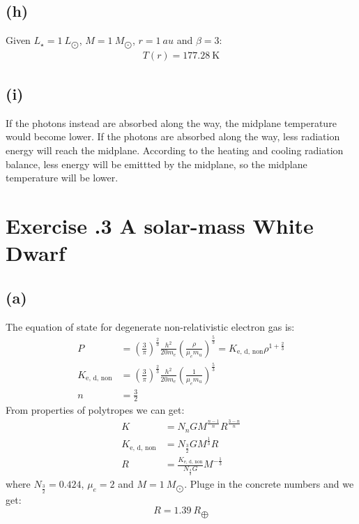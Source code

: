 \documentclass[a4paper,12pt]{article}
\begin{document}
\subsection*{(h)}
Given $L_\star = 1 \ L_{\bigodot}$, $M = 1 \ M_{\bigodot}$, $r = 1\ au$ and $\beta =3$:
\begin{align*}
    T(r) = 177.28 \ \text{K}
\end{align*}

\subsection*{(i)}
If the photons instead are absorbed along the way, 
the midplane temperature would become lower.
If the photons are absorbed along the way,
less radiation energy will reach the midplane. 
According to the heating and cooling radiation balance, 
less energy will be emittted by the midplane, so the 
midplane temperature will be lower.

\section*{\textbf{Exercise \uppercase\expandafter{}.3 A solar-mass White Dwarf}}
\subsection*{(a)}
The equation of state for degenerate non-relativistic electron gas is:
\begin{align*}
    P &= (\frac{3}{\pi})^{\frac{2}{3}} \frac{h^2}{20 m_e} (\frac{\rho}{\mu_e m_u})^{\frac{5}{3}} 
    = K_{\text{e, d, non}} \rho^{1 + \frac{2}{3}}\\
    K_{\text{e, d, non}} &= (\frac{3}{\pi})^{\frac{2}{3}} \frac{h^2}{20 m_e} (\frac{1}{\mu_e m_u})^{\frac{5}{3}} \\
    n &= \frac{3}{2} 
\end{align*}
From properties of polytropes we can get:
\begin{align*}
    K &= N_n G M^{\frac{n-1}{n}} R^{\frac{3-n}{n}} \\
    K_{\text{e, d, non}} &= N_{\frac{3}{2}} G M^{\frac{1}{3}} R \\
    R &= \frac{K_{\text{e, d, non}}}{N_{\frac{3}{2}} G} M^{-\frac{1}{3}}
\end{align*}
where $N_{\frac{3}{2}} = 0.424$, $\mu_e = 2$ and $M = 1 \ M_{\bigodot}$. Pluge in the 
concrete numbers and we get:
\begin{equation*}
    R = 1.39 \ R_{\bigoplus}
\end{equation*}
\end{document}
